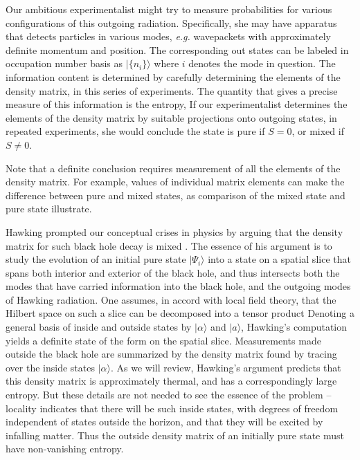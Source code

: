 Our ambitious experimentalist might try to measure probabilities for various configurations of this outgoing radiation.  Specifically, she may have apparatus that detects particles in various modes, {\it e.g.} wavepackets with approximately definite momentum and position.  The corresponding out states can be labeled in occupation number basis as $|\{n_i\}\rangle$ where $i$ denotes the mode in question.  The information content is determined by carefully determining the elements of the density matrix,
%
\eqn\denselem{\rho_{\ncol\ncolp} = \langle \ncol|\rho | \ncolp\rangle\ ,}
%
in this series of experiments.
The quantity that gives a precise measure of this information is the entropy,
%
\eqn{}
%
If our experimentalist determines the elements of the density matrix by suitable projections onto outgoing states, in repeated  experiments, she would conclude  the state is pure if $S=0$, or mixed if $S\neq0$.

Note that a definite conclusion requires measurement of all the elements of the density matrix. For example, values of individual matrix elements can make the difference between pure and mixed states, as comparison of the mixed state
%
\eqn{}
%
and pure state
%
\eqn{}
%
illustrate.

Hawking prompted our  conceptual crises in physics by arguing that the density matrix for such black hole decay is mixed
.  The essence of his argument is to study the evolution of an initial pure state $|\Psi_i\rangle$ into a state on a spatial slice that spans both interior and exterior of the black hole, and thus intersects both the modes that have carried information into the black hole, and the outgoing modes of Hawking radiation.  One assumes, in accord with local field theory, that the Hilbert space on such a slice can be decomposed into a tensor product
%
\eqn{}
%
Denoting a general basis of inside and outside states by $|\alpha\rangle$ and $|a\rangle$,
Hawking's computation yields a definite state of the form
%
\eqn{}
%
on the spatial slice.
Measurements made outside the black hole are summarized by the density matrix found by tracing over the inside states $|\alpha\rangle$.  As we will review, Hawking's argument predicts that this density matrix is approximately thermal, and has a correspondingly large entropy.  But these details are not needed to see the essence of the problem -- locality indicates that there will be such inside states, with degrees of freedom independent of states outside the horizon, and that they will be excited by infalling matter.  Thus the outside density matrix of an initially pure state must have non-vanishing entropy.

